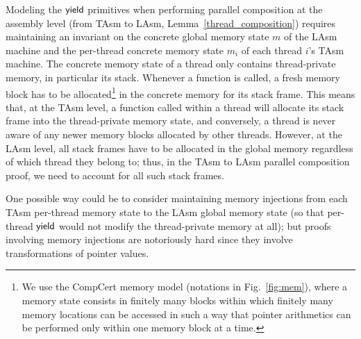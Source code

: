 
Modeling the $\mathsf{yield}$ primitives when performing parallel
composition at the assembly level (from TAsm to LAsm, Lemma~\ref{thread_composition}) requires
maintaining an invariant on the concrete global memory state $m$ of
the LAsm machine and the per-thread concrete memory state $m_i$ of
each thread $i$'s TAsm machine. The concrete memory state of a thread
only contains thread-private memory, in particular its stack. Whenever
a function is called, a fresh memory block has to be allocated\footnote{We use the CompCert memory model \cite{leroy08}(notations in Fig.~\ref{fig:mem}), where a memory state consists in finitely many blocks within which finitely many memory locations can be accessed in such a way that pointer arithmetics can be performed only within one memory block at a time.} in the
concrete memory for its stack frame. This means that, at the TAsm
level, a function called within a thread will allocate its stack frame
into the thread-private memory state, and conversely, a thread is
never aware of any newer memory blocks allocated by other
threads. However, at the LAsm level, all stack frames have to be allocated
in the global memory regardless of which thread they belong to;
thus, in the TAsm to LAsm parallel composition proof, we need to account
for all such stack frames.

One possible way could be to consider maintaining memory injections
from each TAsm per-thread memory state to the LAsm global memory state
(so that per-thread $\mathsf{yield}$ would not modify the thread-private
memory at all); but proofs involving memory injections are notoriously
hard since they involve transformations of pointer values.

